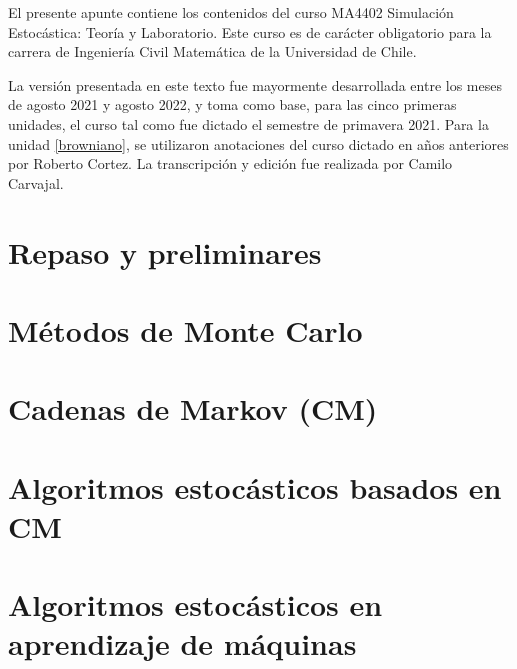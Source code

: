 \documentclass[letterpaper,11pt]{article} %
\theoremstyle{defbreak}
\theoremstyle{propbreak}
\theoremstyle{remark}
\theoremstyle{break}
\begin{document}
	



El presente apunte contiene los contenidos del curso MA4402 Simulación Estocástica: Teoría y Laboratorio. Este curso es de carácter obligatorio para la carrera de Ingeniería Civil Matemática de la Universidad de Chile.

\newp La versión presentada en este texto fue mayormente desarrollada entre los meses de agosto 2021 y agosto 2022, y toma como base, para las cinco primeras unidades, el curso tal como fue dictado el semestre de primavera 2021. Para la unidad \ref{browniano}, se utilizaron anotaciones del curso dictado en años anteriores por Roberto Cortez. La transcripción y edición fue realizada por Camilo Carvajal. 

\newpage




\section{Repaso y preliminares}


\newpage
\section{Métodos de Monte Carlo}



\newpage
\section{Cadenas de Markov (CM)}


\newpage
\section{Algoritmos estocásticos basados en CM}


\newpage
\section{Algoritmos estocásticos en aprendizaje de máquinas}

\end{document}
